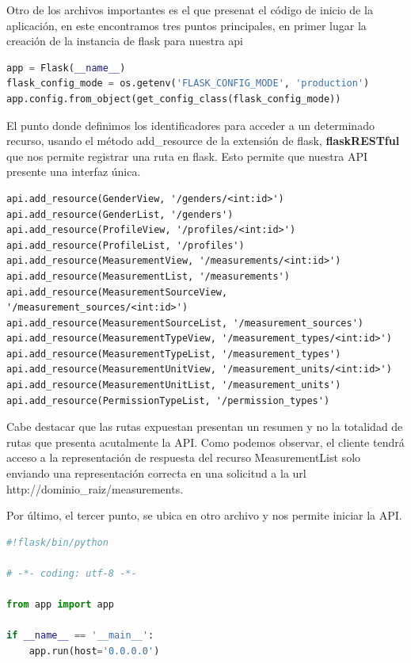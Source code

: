 \documentclass[a4paper,12pt]{article}
\begin{document}
\begin{itemize}
Otro de los archivos importantes es el que presenat el código de inicio de la aplicación, en este encontramos tres puntos principales, en primer lugar la creación de la instancia de flask para nuestra api

\begin{lstlisting}[language=Python]
app = Flask(__name__)
flask_config_mode = os.getenv('FLASK_CONFIG_MODE', 'production')
app.config.from_object(get_config_class(flask_config_mode))
\end{lstlisting}

El punto donde definimos los identificadores para acceder a un determinado recurso, usando el método add\_resource de la extensión de flask, \textbf{flaskRESTful} que nos permite registrar una ruta en flask. Esto permite que nuestra API presente una interfaz única.

\begin{lstlisting}
api.add_resource(GenderView, '/genders/<int:id>')
api.add_resource(GenderList, '/genders')
api.add_resource(ProfileView, '/profiles/<int:id>')
api.add_resource(ProfileList, '/profiles')
api.add_resource(MeasurementView, '/measurements/<int:id>')
api.add_resource(MeasurementList, '/measurements')
api.add_resource(MeasurementSourceView, '/measurement_sources/<int:id>')
api.add_resource(MeasurementSourceList, '/measurement_sources')
api.add_resource(MeasurementTypeView, '/measurement_types/<int:id>')
api.add_resource(MeasurementTypeList, '/measurement_types')
api.add_resource(MeasurementUnitView, '/measurement_units/<int:id>')
api.add_resource(MeasurementUnitList, '/measurement_units')
api.add_resource(PermissionTypeList, '/permission_types')
\end{lstlisting}

Cabe destacar que las rutas expuestan presentan un resumen y no la totalidad de rutas que presenta acutalmente la API.
Como podemos observar, el cliente tendrá acceso a la representación de respuesta del recurso MeasurementList solo enviando una representación correcta en una solicitud a la url http://dominio\_raiz/measurements.

Por último, el tercer punto, se ubica en otro archivo y nos permite iniciar la API.

\begin{lstlisting}[language=Python]
#!flask/bin/python

# -*- coding: utf-8 -*-

from app import app

if __name__ == '__main__':
    app.run(host='0.0.0.0')
\end{lstlisting}


\end{itemize}
\end{document}

